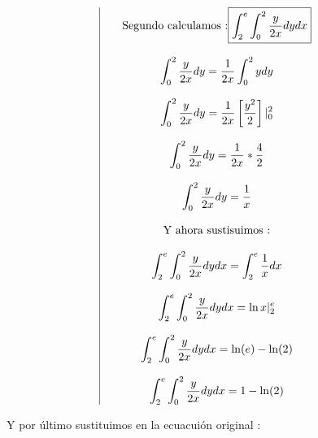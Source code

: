 \documentclass[12pt]{article}
\begin{document}
\begin{center}
\begin{equation*}
\begin{array}{c|c}
\begin{array}{rcl}
                \end{array}
                &
                \begin{array}{rcl}
                    &\mbox{Segundo calculamos :\fbox{$\displaystyle\int_{2}^{e}\int_{0}^{2}\frac{y}{2x}dydx $}}&
                    \\
                    \\
                    & \displaystyle\int_{0}^{2}\frac{y}{2x}dy = \frac{1}{2x}\int_{0}^{2}ydy&
                    \\
                    \\
                    & \displaystyle\int_{0}^{2}\frac{y}{2x}dy = \frac{1}{2x}\left[\frac{y^2}{2}\right]\vert_{0}^{2}&
                    \\
                    \\
                    & \displaystyle\int_{0}^{2}\frac{y}{2x}dy = \frac{1}{2x} * \frac{4}{2}&
                    \\
                    \\
                    & \displaystyle\int_{0}^{2}\frac{y}{2x}dy = \frac{1}{x} &
                    \\
                    \\
                    &\displaystyle\displaystyle\mbox{Y ahora sustisuimos :} &
                    \\
                    \\
                    &\displaystyle\int_{2}^{e}\int_{0}^{2}\frac{y}{2x}dydx = \int_{2}^{e}\frac{1}{x}dx &
                    \\
                    \\
                    &\displaystyle\int_{2}^{e}\int_{0}^{2}\frac{y}{2x}dydx = \ln x\vert_{2}^{e} &
                    \\
                    \\
                    &\displaystyle\int_{2}^{e}\int_{0}^{2}\frac{y}{2x}dydx = \ln(e)-\ln(2) &
                    \\
                    \\
                    &\displaystyle\int_{2}^{e}\int_{0}^{2}\frac{y}{2x}dydx = 1 -\ln(2) &
                \end{array}
            \end{array}
        \end{equation*}
    \end{center}
    \begin{flushleft}
        Y por \'ultimo sustituimos en la  ecuacui\'on original :
    \end{flushleft}
\end{document}
